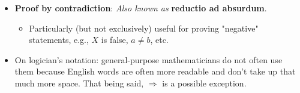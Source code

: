 \documentclass[../main.tex]{subfiles}
\begin{document}
\begin{itemize}
\begin{itemize}
    \end{itemize}
    \item \textbf{Proof by contradiction}:  \emph{Also known as} \textbf{reductio ad absurdum}.
    \begin{itemize}
        \item Particularly (but not exclusively) useful for proving "negative" statements, e.g., $X$ is false, $a\neq b$, etc.
    \end{itemize}
    \item On logician's notation: general-purpose mathematicians do not often use them because English words are often more readable and don't take up that much more space. That being said, $\Longrightarrow$ is a possible exception.
\end{itemize}
\end{document}
